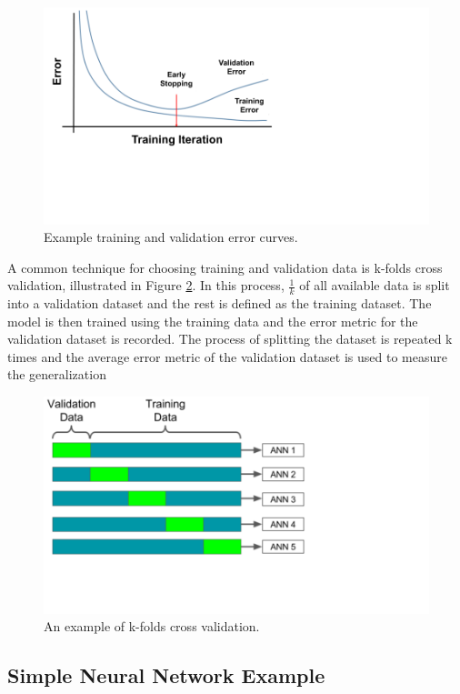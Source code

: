 \begin{figure}[H]
	\centering
	\includegraphics[trim=0 190 390 0,clip,width=0.65\linewidth]{images/training_testing_error_v2}
	\caption{Example training and validation error curves.}
	\label{fig:training_testing_error}
\end{figure}

A common technique for choosing training and validation data is k-folds cross validation, illustrated in Figure \ref{fig:kfolds}. In this process, $\frac{1}{k}$ of all available data is split into a validation dataset and the rest is defined as the training dataset. The model is then trained using the training data and the error metric for the validation dataset is recorded. The process of splitting the dataset is repeated k times and the average error metric of the validation dataset is used to measure the generalization 


\begin{figure}[H]
	\centering
	\includegraphics[trim=0 140 310 0,clip,width=0.7\linewidth]{images/kfolds}
	\caption{An example of k-folds cross validation.}
	\label{fig:kfolds}
\end{figure}

\subsection{Simple Neural Network Example}

